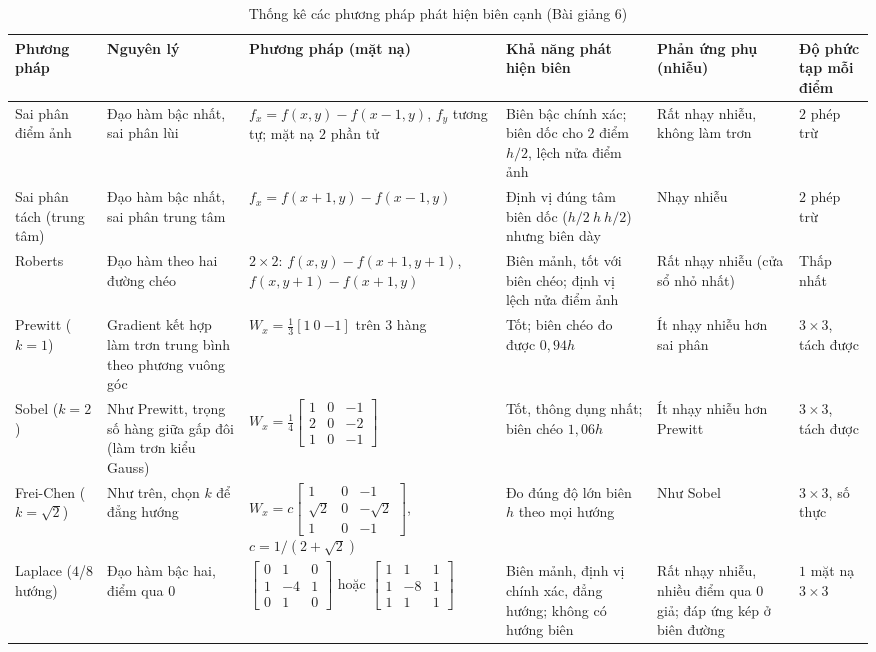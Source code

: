 \begin{table}[!htbp]
\centering
\scriptsize
\caption{Thống kê các phương pháp phát hiện biên cạnh (Bài giảng 6)}
\label{tab:w6_edge_methods}
\renewcommand{\arraystretch}{1.3}
\begin{tabularx}{\textwidth}{|p{1.5cm}|p{2.0cm}|X|X|X|p{1.5cm}|}
\hline
\textbf{Phương pháp} & \textbf{Nguyên lý} & \textbf{Phương pháp (mặt nạ)} & \textbf{Khả năng phát hiện biên} & \textbf{Phản ứng phụ (nhiễu)} & \textbf{Độ phức tạp mỗi điểm} \\
\hline
Sai phân điểm ảnh & Đạo hàm bậc nhất, sai phân lùi & $f_x = f(x, y) - f(x - 1, y)$, $f_y$ tương tự; mặt nạ $2$ phần tử & Biên bậc chính xác; biên dốc cho $2$ điểm $h/2$, lệch nửa điểm ảnh & Rất nhạy nhiễu, không làm trơn & $2$ phép trừ \\
\hline
Sai phân tách (trung tâm) & Đạo hàm bậc nhất, sai phân trung tâm & $f_x = f(x + 1, y) - f(x - 1, y)$ & Định vị đúng tâm biên dốc ($h/2\ h\ h/2$) nhưng biên dày & Nhạy nhiễu & $2$ phép trừ \\
\hline
Roberts & Đạo hàm theo hai đường chéo & $2 \times 2$: $f(x, y) - f(x + 1, y + 1)$, $f(x, y + 1) - f(x + 1, y)$ & Biên mảnh, tốt với biên chéo; định vị lệch nửa điểm ảnh & Rất nhạy nhiễu (cửa sổ nhỏ nhất) & Thấp nhất \\
\hline
Prewitt ($k = 1$) & Gradient kết hợp làm trơn trung bình theo phương vuông góc & $W_x = \frac13[1\ 0\ {-1}]$ trên $3$ hàng & Tốt; biên chéo đo được $0{,}94h$ & Ít nhạy nhiễu hơn sai phân & $3 \times 3$, tách được \\
\hline
Sobel ($k = 2$) & Như Prewitt, trọng số hàng giữa gấp đôi (làm trơn kiểu Gauss) & $W_x = \frac14\left[\begin{smallmatrix}1&0&-1\\2&0&-2\\1&0&-1\end{smallmatrix}\right]$ & Tốt, thông dụng nhất; biên chéo $1{,}06h$ & Ít nhạy nhiễu hơn Prewitt & $3 \times 3$, tách được \\
\hline
Frei-Chen ($k = \sqrt2$) & Như trên, chọn $k$ để đẳng hướng & $W_x = c\left[\begin{smallmatrix}1&0&-1\\\sqrt2&0&-\sqrt2\\1&0&-1\end{smallmatrix}\right]$, \newline $c = 1/(2 + \sqrt2)$ & Đo đúng độ lớn biên $h$ theo mọi hướng & Như Sobel & $3 \times 3$, số thực \\
\hline
Laplace ($4$/$8$ hướng) & Đạo hàm bậc hai, điểm qua $0$ & $\left[\begin{smallmatrix}0&1&0\\1&-4&1\\0&1&0\end{smallmatrix}\right]$ hoặc $\left[\begin{smallmatrix}1&1&1\\1&-8&1\\1&1&1\end{smallmatrix}\right]$ & Biên mảnh, định vị chính xác, đẳng hướng; không có hướng biên & Rất nhạy nhiễu, nhiều điểm qua $0$ giả; đáp ứng kép ở biên đường & $1$ mặt nạ $3 \times 3$ \\

\end{tabularx}
\end{table}

